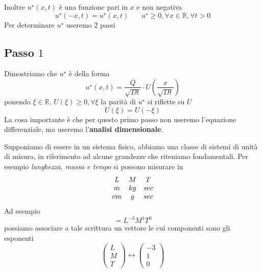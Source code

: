 \documentclass[10pt,a4paper,twoside,openright]{book}
\begin{document}
Inoltre $u^{\star }(x,t)$ è una funzione pari in $x$ e non negativa
\begin{equation*}
    u^{\star }(-x,t) =u^{\star }(x,t) \ \ \ \ \ \ \ \ u^{\star } \geqslant 0,\forall x\in \mathbb{R},\forall t >0
\end{equation*}
Per determinare $u^{\star }$ useremo $2$ passi
\subsection{Passo \texorpdfstring{$1$}{1}}

Dimostriamo che $u^{\star }$ è della forma
\begin{equation*}
    u^{\star }(x,t) =\frac{Q}{\sqrt{Dt}} \cdotp U\left(\frac{x}{\sqrt{Dt}}\right)
\end{equation*}
ponendo $\xi \in \mathbb{R}$, $U(\xi) \geqslant 0,\forall \xi $ la parità di $u^{\star }$ si riflette su $U$
\begin{equation*}
    U(\xi) =U(-\xi)
\end{equation*}
La cosa importante è che per questo primo passo non useremo l'equazione differenziale, ma useremo l'\textbf{analisi dimensionale}.
\begin{oss}
     Supponiamo di essere in un sistema fisico, abbiamo una classe di sistemi di unità di misura, in riferimento ad alcune grandezze che riteniamo fondamentali. Per esempio \textit{lunghezza, massa e tempo} si possono misurare in
    \begin{equation*}
        \begin{array}{ c c c }
            L  & M  & T   \\
            m  & kg & sec \\
            cm & g  & sec
        \end{array}
    \end{equation*}
    Ad esempio
    \begin{equation*}
        [ \rho ] =L^{-3} M^{1} T^{0}
    \end{equation*}
    possiamo associare a tale scrittura un vettore le cui componenti sono gli esponenti
    \begin{equation*}
        \begin{pmatrix}
            L \\
            M \\
            T
        \end{pmatrix} \leftrightarrow \begin{pmatrix}
            -3 \\
            1  \\
            0
        \end{pmatrix}
    \end{equation*}
\end{oss}
\end{document}

